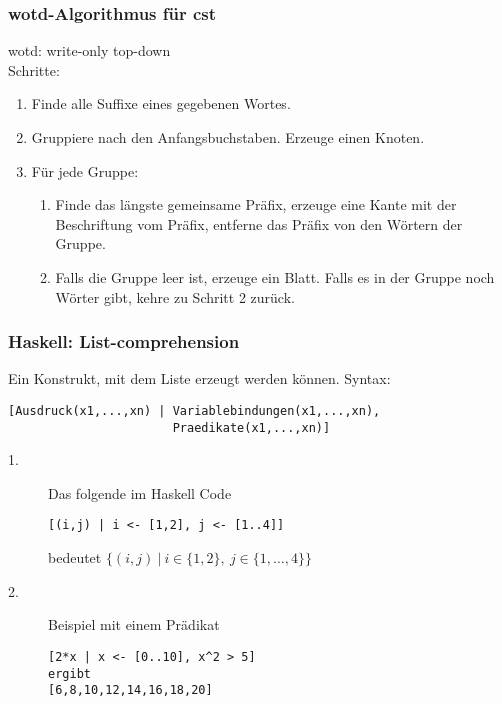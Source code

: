 \documentclass{beamer}
\begin{document}
\begin{frame}[t]
\frametitle{wotd-Algorithmus für cst}
    wotd: write-only top-down\\
    \medskip
    Schritte:
    \begin{enumerate}
    \item Finde alle Suffixe eines gegebenen Wortes.
    \item Gruppiere nach den Anfangsbuchstaben. Erzeuge einen Knoten.
    \item Für jede Gruppe:
    \begin{enumerate}
    \item Finde das längste gemeinsame Präfix, erzeuge eine Kante mit der Beschriftung vom Präfix, entferne das Präfix von den Wörtern der Gruppe.
    \item Falls die Gruppe leer ist, erzeuge ein Blatt. Falls es in der Gruppe noch Wörter gibt, kehre zu Schritt 2 zurück.
    \end{enumerate}
    \end{enumerate}
\end{frame}

\begin{frame}[fragile]
\frametitle{Haskell: List-comprehension}  
Ein Konstrukt, mit dem Liste erzeugt werden können. Syntax:
\begin{lstlisting}
[Ausdruck(x1,...,xn) | Variablebindungen(x1,...,xn),
                       Praedikate(x1,...,xn)]
\end{lstlisting}
\begin{examples}
\begin{description}
\item[1.]Das folgende im Haskell Code
\begin{lstlisting}
[(i,j) | i <- [1,2], j <- [1..4]] 
\end{lstlisting}
bedeutet $\{(i,j)\:|\: i \in \{1,2\}, \: j \in \{1,\dots,4\} \}$
\item[2.]Beispiel mit einem Prädikat
\begin{lstlisting}
[2*x | x <- [0..10], x^2 > 5]
ergibt
[6,8,10,12,14,16,18,20]
\end{lstlisting}
\end{description}
\end{examples}
\bigskip   
\end{frame}
\end{document}

